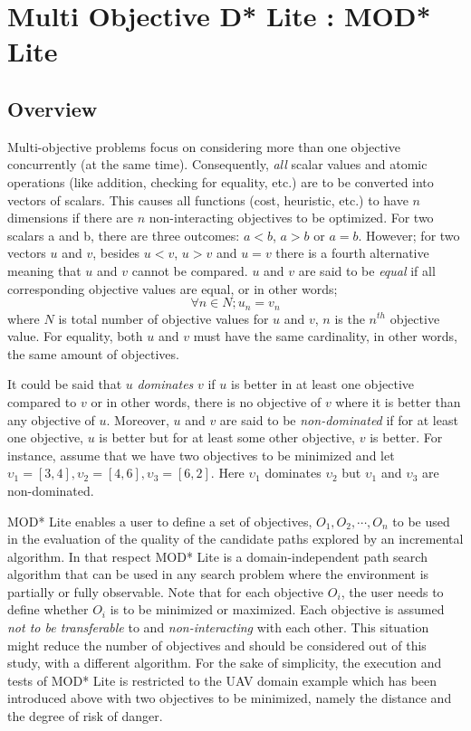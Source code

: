 \section{Multi Objective D*  Lite : MOD* Lite}
\subsection{Overview}
Multi-objective problems focus on considering more than one objective concurrently (at the same time). Consequently, \textit{all} scalar values and atomic operations (like addition, checking for equality, etc.) are to be converted into vectors of scalars. This causes all functions (cost, heuristic, etc.) to have $n$ dimensions if there are $n$ non-interacting objectives to be optimized. For two scalars a and b, there are three outcomes: $a<b$, $a>b$ or $a=b$. However; for two vectors $u$ and $v$, besides $u<v$, $u>v$ and $u=v$ there is a fourth alternative meaning that $u$ and $v$ cannot be compared. $u$ and $v$ are said to be \textit{equal} if all corresponding objective values are equal, or in other words;
\[ \forall n \in N;	 u_{n} = v_{n} \] where $N$ is total number of objective values for $u$ and $v$, $n$ is the $n^{th}$ objective value. For equality, both $u$ and $v$ must have the same cardinality, in other words, the same amount of objectives.

It could be said that $u$ \textit{dominates} $v$ if $u$ is better in at least one objective compared to $v$ or in other words, there is no objective of $v$ where it is better than any objective of $u$. Moreover, $u$ and $v$ are said to be \textit{non-dominated} if for at least one objective,  $u$ is better but for at least some other objective, $v$ is better. For instance, assume that we have two objectives to be minimized and let $\upsilon_{1}=[3,4], \upsilon_{2}=[4,6], \upsilon_{3}=[6,2] $. Here $\upsilon_{1}$ dominates $\upsilon_{2}$ but $\upsilon_{1}$ and $\upsilon_{3}$ are non-dominated.

MOD* Lite enables a user to define a set of objectives, $O_1, O_2, \cdots, O_n$ to be used in the evaluation of the quality of the candidate paths explored by an incremental algorithm. In that respect MOD* Lite is a domain-independent path search algorithm that can be used in any search problem where the environment is partially or fully observable. Note that for each objective $O_i$, the user needs to define whether $O_i$ is to be minimized or maximized. Each objective is assumed \textit{not to be transferable} to and \textit{non-interacting} with each other. This situation might reduce the number of objectives and should be considered out of this study, with a different algorithm. For the sake of simplicity, the execution and tests of MOD* Lite is restricted to the UAV domain example which has been introduced above with two objectives to be minimized, namely the distance and the degree of risk of danger.

